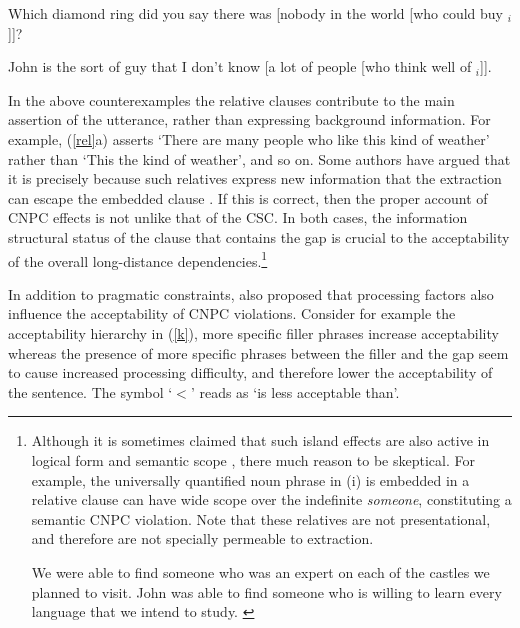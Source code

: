 \documentclass[output=paper]{langsci/langscibook}
\begin{document}
\item Which diamond ring did you say there was [nobody in the world [who could
buy \spc$_i$]]?\\
\citep[206]{pollardsag}

\item John is the sort of guy that I don't know [a lot of people [who think well of
\spc$_i$]].\\
\citep[230]{culicover99}
\z \label{rel}
\z

In the above counterexamples the relative clauses contribute to the main assertion of the utterance, rather than expressing background information. For example, (\ref{rel}a) asserts `There are many people who like this kind of weather' rather than `This the kind of weather', and so on.
Some authors have argued that it is precisely because such relatives
express new information that the extraction can escape the embedded clause
  \citep{shirlappin,kuno87,Dean,goldberg13}.  If this is correct, then the proper 
  account of CNPC effects is not unlike that of the CSC. In both cases, 
  the information structural status of the clause that contains the gap is crucial
  to the acceptability of the overall long-distance dependencies.\footnote{Although it is sometimes claimed
   that
such  island effects are also active in logical form and semantic scope \citep{may85,ruys,fox,sab,katzira}, 
  there much reason to be skeptical.  For example, the universally quantified noun phrase  in (i)  is embedded in a relative clause can have wide scope over the indefinite \emph{someone}, constituting a semantic CNPC violation. Note that these relatives are not presentational, and therefore are not specially permeable to extraction.

\eal
\ex  We were able to find someone who was an expert on each of the
     castles we planned to visit.  \citep[304]{MRS}
\ex John was able to find someone  who is willing to learn every  language
    that we intend to study. \citep{chavesrnr}
\zllast}

 
 
  
In addition to pragmatic constraints,  \citet{kluender92,kluender} also proposed that 
processing factors also  influence the acceptability of    CNPC violations.
Consider for example the acceptability hierarchy in  (\ref{k}),  more specific filler phrases increase acceptability whereas    the presence of more specific phrases between the filler and the gap seem  to cause increased processing difficulty, and therefore   lower the acceptability of the sentence.  The symbol `$<$' reads as `is less acceptable than'.
\end{document}
